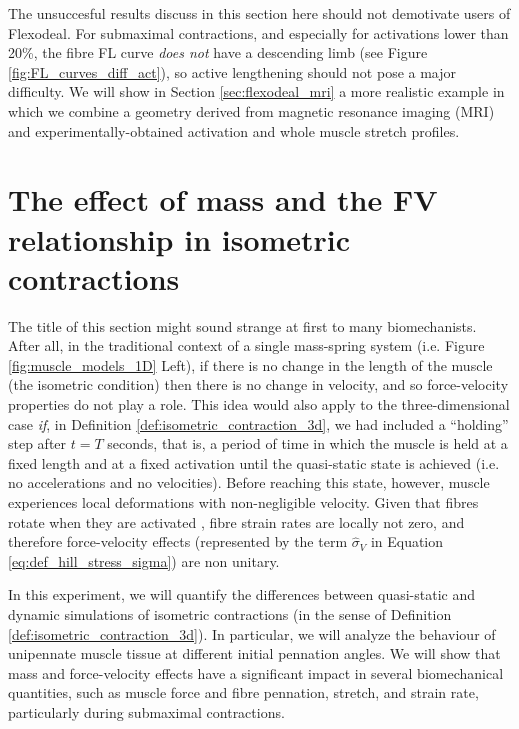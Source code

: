 \documentclass{sfuthesis}
\numberwithin{equation}{section}
\numberwithin{figure}{chapter}
\numberwithin{table}{chapter}
\theoremstyle{definition}
\begin{document}
The unsuccesful results discuss in this section here should not demotivate users of Flexodeal. For submaximal contractions, and especially for activations lower than 20\%, the fibre FL curve \textit{does not} have a descending limb (see Figure \ref{fig:FL_curves_diff_act}), so active lengthening should not pose a major difficulty. We will show in Section \ref{sec:flexodeal_mri} a more realistic example in which we combine a geometry derived from magnetic resonance imaging (MRI) and experimentally-obtained activation and whole muscle stretch profiles.

\section{The effect of mass and the FV relationship in isometric contractions} \label{sec:flexodeal_dynamic_effects}

The title of this section might sound strange at first to many biomechanists. After all, in the traditional context of a single mass-spring system (i.e. Figure \ref{fig:muscle_models_1D} Left), if there is no change in the length of the muscle (the isometric condition) then there is no change in velocity, and so force-velocity properties do not play a role. This idea would also apply to the three-dimensional case \textit{if}, in Definition \ref{def:isometric_contraction_3d}, we had included a ``holding'' step after $t = T$ seconds, that is, a period of time in which the muscle is held at a fixed length and at a fixed activation until the quasi-static state is achieved (i.e. no accelerations and no velocities). Before reaching this state, however, muscle experiences local deformations with non-negligible velocity. Given that fibres rotate when they are activated \cite{LieberFriden2000}, fibre strain rates are locally not zero, and therefore force-velocity effects (represented by the term $\widehat{\sigma}_V$ in Equation \eqref{eq:def_hill_stress_sigma}) are non unitary. 

In this experiment, we will quantify the differences between quasi-static and dynamic simulations of isometric contractions (in the sense of Definition \ref{def:isometric_contraction_3d}). In particular, we will analyze the behaviour of unipennate muscle tissue at different initial pennation angles. We will show that mass and force-velocity effects have a significant impact in several biomechanical quantities, such as muscle force and fibre pennation, stretch, and strain rate, particularly during submaximal contractions.
\end{document}
